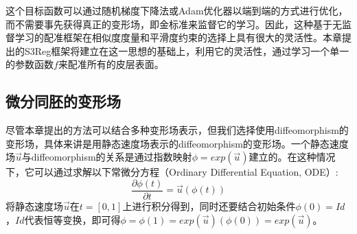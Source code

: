 这个目标函数可以通过随机梯度下降法或Adam优化器\cite{kingma2014adam}以端到端的方式进行优化，而不需要事先获得真正的变形场，即金标准来监督它的学习。因此，这种基于无监督学习的配准框架在相似度度量和平滑度约束的选择上具有很大的灵活性。本章提出的S3Reg框架将建立在这一思想的基础上，利用它的灵活性，通过学习一个单一的参数函数$f$来配准所有的皮层表面。

\subsection{微分同胚的变形场}\label{sec:微分同胚的变形场}
尽管本章提出的方法可以结合多种变形场表示，但我们选择使用diffeomorphism的变形场，具体来讲是用静态速度场表示的diffeomorphism的变形场。一个静态速度场$\overrightarrow{u}$与diffeomorphism的关系是通过指数映射$\phi=exp(\overrightarrow{u})$建立的。在这种情况下，它可以通过求解以下常微分方程（Ordinary Differential Equation, ODE）:
\begin{equation}
{\frac{\partial \phi(t)}{\partial t} }=\overrightarrow{u}(\phi(t))
\end{equation}
将静态速度场$\overrightarrow{u}$在$t=[0,1]$上进行积分得到，同时还要结合初始条件$\phi(0)=Id$，$Id$代表恒等变换，即可得$\phi=\phi(1)=exp(\overrightarrow{u})(\phi(0))=exp(\overrightarrow{u})$。

